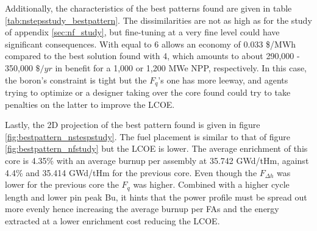 Additionally, the characteristics of the best patterns found are given in table \ref{tab:nstepsstudy_bestpattern}.  The dissimilarities are not as high as for the  study of appendix \ref{sec:nf_study}, but fine-tuning  at a very fine level could have significant consequences. With  equal to 6 allows an economy of 0.033 \$/MWh compared to the best solution found with 4, which amounts to about 290,000 - 350,000 $\$/yr$ in benefit for a 1,000 or 1,200 MWe NPP, respectively. In this case, the boron's constraint is tight but the $F_q$'s one has more leeway, and agents trying to optimize or a designer taking over the core found could try to take penalties on the latter to improve the LCOE.

Lastly, the 2D projection of the best pattern found is given in figure \ref{fig:bestpattern_nstespstudy}. The fuel placement is similar to that of figure \ref{fig:bestpattern_nfstudy} but the LCOE is lower. The average enrichment of this core is 4.35\% with an average burnup per assembly at 35.742 GWd/tHm, against 4.4\% and 35.414 GWd/tHm for the previous core. Even though the $F_{\Delta h}$ was lower for the previous core the $F_q$ was higher. Combined with a higher cycle length and lower pin peak Bu, it hints that the power profile must be spread out more evenly hence increasing the average burnup per FAs and the energy extracted at a lower enrichment cost reducing the LCOE.

